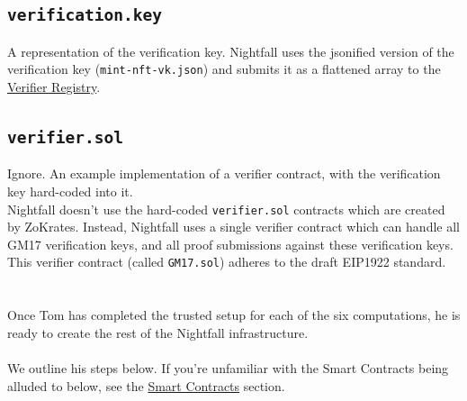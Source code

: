 \documentclass{article}
\begin{document}
\subsection*{\texttt{verification.key}}
A representation of the verification key. Nightfall uses the jsonified version of the verification key (\texttt{mint-nft-vk.json}) and submits it as a flattened array to the \hyperref[sec:smartContracts]{Verifier Registry}.
\subsection*{\texttt{verifier.sol}}
Ignore. An example implementation of a verifier contract, with the verification key hard-coded into it.\\
Nightfall doesn't use the hard-coded \texttt{verifier.sol} contracts which are created by ZoKrates. Instead, Nightfall uses a single verifier contract which can handle all GM17 verification keys, and all proof submissions against these verification keys. This verifier contract (called \texttt{GM17.sol}) adheres to the draft EIP1922 standard.\\
\\
\\
Once Tom has completed the trusted setup for each of the six computations, he is ready to create the rest of the Nightfall infrastructure.\\
\\
We outline his steps below. If you're unfamiliar with the Smart Contracts being alluded to below, see the \hyperref[sec:smartContracts]{Smart Contracts} section.
\end{document}
